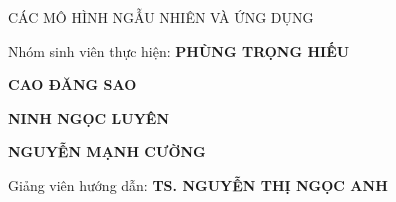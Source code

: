 \documentclass[12pt,a4paper,oneside]{book}
\newcommand{\projectname}{
	Học tăng cường\par
}
\newcommand{\teachername}{TS. Nguyễn Thị Ngọc Anh}
\begin{document}
\begin{titlepage}
\begin{center}
		\begin{LARGE}
			\MakeUppercase{Các mô hình ngẫu nhiên và ứng dụng}\par
		\end{LARGE}
		\vspace{1.5cm}
		\vspace{1cm}
		\begin{large}
			\begin{flushleft}
				\hspace{2cm}
				Nhóm sinh viên thực hiện: \textbf{PHÙNG TRỌNG HIẾU}\par
				\hspace{2cm}
				\space\space\space\space\space\space
				\space\space\space\space\space\space
				\space\space\space\space\space\space
				\space\space\space\space\space\space
				\space\space\space\space\space\space
				\space\space\space\space\space\space
				\space\space\space\space\space\space
				\space
				\textbf{CAO ĐĂNG SAO}\par
				\hspace{2cm}
				\space\space\space\space\space\space
				\space\space\space\space\space\space
				\space\space\space\space\space\space
				\space\space\space\space\space\space
				\space\space\space\space\space\space
				\space\space\space\space\space\space
				\space\space\space\space\space\space
				\space
				\textbf{NINH NGỌC LUYÊN}\par
				\hspace{2cm}
				\space\space\space\space\space\space
				\space\space\space\space\space\space
				\space\space\space\space\space\space
				\space\space\space\space\space\space
				\space\space\space\space\space\space
				\space\space\space\space\space\space
				\space\space\space\space\space\space
				\space
				\textbf{NGUYỄN MẠNH CƯỜNG}\par
				\vspace{0.5cm}
				\hspace{2cm}
				Giảng viên hướng dẫn: \MakeUppercase{\textbf{\teachername}}\par

\end{flushleft}
\end{large}
\end{center}
\end{titlepage}
\end{document}
